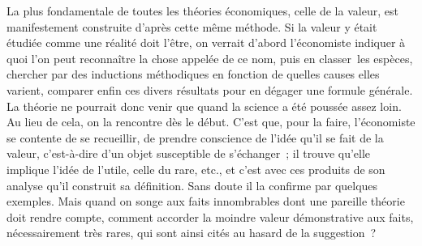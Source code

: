 \documentclass[french,twoside]{book} %
\begin{document}
La plus fondamentale de toutes les théories économiques, celle de la valeur, est manifestement construite d’après cette même méthode. Si la valeur y était étudiée comme une réalité doit l’être, on verrait d’abord l’économiste indiquer à quoi l’on peut reconnaître la chose appelée de ce nom, puis en classer les espèces, chercher par des inductions méthodiques en fonction de quelles causes elles varient, comparer enfin ces divers résultats pour en dégager une formule générale. La théorie ne pourrait donc venir que quand la science a été poussée assez loin. Au lieu de cela, on la rencontre dès le début. C’est que, pour la faire, l’économiste se contente de se recueillir, de prendre conscience de l’idée qu’il se fait de la valeur, c’est-à-dire d’un objet susceptible de s’échanger ; il trouve qu’elle implique l’idée de l’utile, celle du rare, etc., et c’est avec ces produits de son analyse qu’il construit sa définition. Sans doute il la confirme par quelques exemples. Mais quand on songe aux faits innombrables dont une pareille théorie doit rendre compte, comment accorder la moindre valeur démonstrative aux faits, nécessairement très rares, qui sont ainsi cités au hasard de la suggestion ?\par
\end{document}
